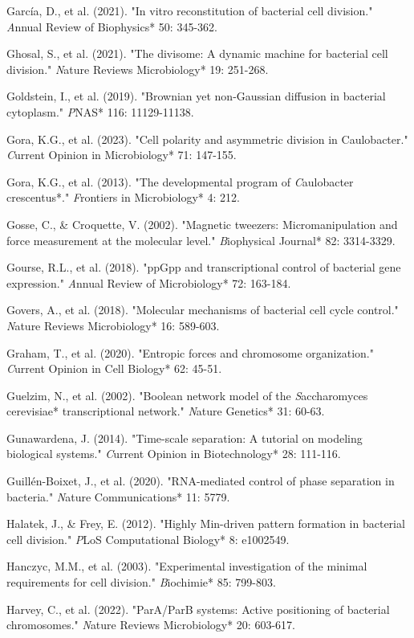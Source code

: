 \documentclass[11pt,a4paper]{article}
\begin{document}
García, D., et al. (2021). "In vitro reconstitution of bacterial cell division." \textit*Annual Review of Biophysics* 50: 345-362.

Ghosal, S., et al. (2021). "The divisome: A dynamic machine for bacterial cell division." \textit*Nature Reviews Microbiology* 19: 251-268.

Goldstein, I., et al. (2019). "Brownian yet non-Gaussian diffusion in bacterial cytoplasm." \textit*PNAS* 116: 11129-11138.

Gora, K.G., et al. (2023). "Cell polarity and asymmetric division in Caulobacter." \textit*Current Opinion in Microbiology* 71: 147-155.

Gora, K.G., et al. (2013). "The developmental program of \textit*Caulobacter crescentus*." \textit*Frontiers in Microbiology* 4: 212.

Gosse, C., & Croquette, V. (2002). "Magnetic tweezers: Micromanipulation and force measurement at the molecular level." \textit*Biophysical Journal* 82: 3314-3329.

Gourse, R.L., et al. (2018). "ppGpp and transcriptional control of bacterial gene expression." \textit*Annual Review of Microbiology* 72: 163-184.

Govers, A., et al. (2018). "Molecular mechanisms of bacterial cell cycle control." \textit*Nature Reviews Microbiology* 16: 589-603.

Graham, T., et al. (2020). "Entropic forces and chromosome organization." \textit*Current Opinion in Cell Biology* 62: 45-51.

Guelzim, N., et al. (2002). "Boolean network model of the \textit*Saccharomyces cerevisiae* transcriptional network." \textit*Nature Genetics* 31: 60-63.

Gunawardena, J. (2014). "Time-scale separation: A tutorial on modeling biological systems." \textit*Current Opinion in Biotechnology* 28: 111-116.

Guillén-Boixet, J., et al. (2020). "RNA-mediated control of phase separation in bacteria." \textit*Nature Communications* 11: 5779.

Halatek, J., & Frey, E. (2012). "Highly Min-driven pattern formation in bacterial cell division." \textit*PLoS Computational Biology* 8: e1002549.

Hanczyc, M.M., et al. (2003). "Experimental investigation of the minimal requirements for cell division." \textit*Biochimie* 85: 799-803.

Harvey, C., et al. (2022). "ParA/ParB systems: Active positioning of bacterial chromosomes." \textit*Nature Reviews Microbiology* 20: 603-617.
\end{document}

